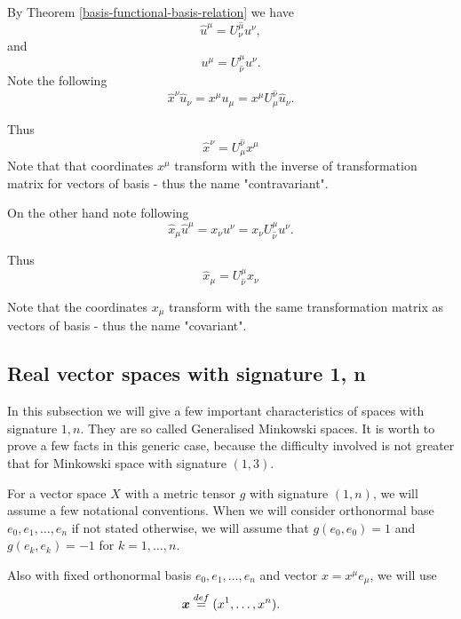\documentclass[main.tex]{subfiles}
\begin{document}
By Theorem \ref{basis-functional-basis-relation} we have
\begin{equation}
\hat{u}^\mu =  U^{\hat{\mu}}_{\nu} u^\nu,
\end{equation}
and 
\begin{equation}
u^\mu = U^{\mu}_{\hat{\nu}} u^\nu.
\end{equation}
Note the following
\begin{equation}
\hat{x}^\nu \hat{u}_\nu = x^\mu u_\mu = x^\mu U^{\hat{\nu}}_\mu  \hat{u}_\nu.
\end{equation}

Thus
\begin{equation}
\boxed{
\hat{x}^\nu = U^{\hat{\nu}}_\mu x^\mu 
}
\end{equation}
Note that that coordinates $x^\mu$ transform with the inverse of transformation matrix for vectors of basis - thus the name "contravariant".

On the other hand note following
\begin{equation}
\hat{x}_\mu \hat{u}^\mu = x_\nu u^\nu = x_\nu U^{\mu}_{\hat{\nu}} u^\nu.
\end{equation}

Thus
\begin{equation}
\boxed{
\hat{x}_\mu = U^{\mu}_{\hat{\nu}} x_\nu}
\end{equation}

Note that the coordinates $x_\mu$ transform with the same transformation matrix as vectors of basis - thus the name "covariant".

\subsection{Real vector spaces with signature 1, n}

In this subsection we will give a few important characteristics of spaces with signature $1, n$. They are so called Generalised Minkowski spaces. It is worth to prove a few facts in this generic case, because the difficulty involved is not greater that for Minkowski space with signature $(1, 3)$.

For a vector space $X$ with a metric tensor $g$ with signature $(1, n)$, we will assume a few notational conventions. When we will consider orthonormal base $e_0, e_1, \dots, e_n$ if not stated otherwise, we will assume that 
$g(e_0, e_0) = 1$ and $g(e_k, e_k) = -1$ for $k = 1, \dots, n$.

Also with fixed orthonormal basis $e_0, e_1, \dots, e_n$ and vector $x = x^\mu e_\mu$, we will use
\begin{equation}
\boldsymbol{x}  \stackrel{def}{=} (x^1, \dots, x^n).
\end{equation}
\end{document}
